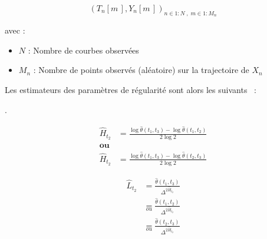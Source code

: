 \begin{equation*}
	( T_n[ m \,], Y_n[ m \,] )_{{n \in 1:N} \; , \; {m \in 1:M_n}}
\end{equation*}

avec :

\begin{itemize}
	\item $N$ : Nombre de courbes observées
	\item $M_n$ : Nombre de points observés (aléatoire) sur la trajectoire de $X_n$
\end{itemize}

Les estimateurs des paramètres de régularité sont alors les suivants ~\cite{maissoro-SmoothnessFTSweakDep}:

\begin{definition}
	.

	\begin{minipage}{0.5\textwidth}
		\begin{align*}
			\hat H_{t_2} & = \frac{ \log \hat \theta(t_1, t_3) - \log \hat \theta(t_1, t_2) }{2 \log 2}
			\\
			\textbf{ou}
			\\
			\hat H_{t_2} & = \frac{ \log \hat \theta(t_1, t_3) - \log \hat \theta(t_2, t_3) }{2 \log 2}
		\end{align*}
	\end{minipage}
	\begin{minipage}{0.5\textwidth}
		\begin{align*}
			\widehat L_{t_2} & = \frac{\widehat \theta(t_1, t_3)}{\Delta^{2 \widehat H_{t_2}}}
			\\ &\underset{ou}= \frac{\widehat \theta(t_1, t_2)}{\Delta^{2 \widehat H_{t_2}}}
			\\ &\underset{ou}= \frac{\widehat \theta(t_2, t_3)}{\Delta^{2 \widehat H_{t_2}}}
		\end{align*}
	\end{minipage}
\end{definition}

